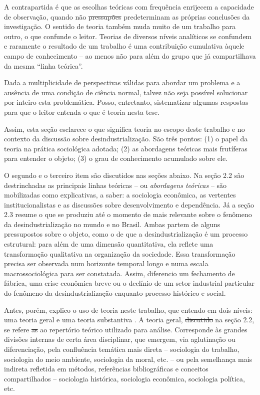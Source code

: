 A contrapartida é que as escolhas teóricas com frequência enrijecem a capacidade
de observação, quando não \sout{pressupões} predeterminam as próprias conclusões da investigação. O sentido de teoria também muda muito de um trabalho para outro, o que confunde o leitor.
Teorias de diversos níveis analíticos
se confundem e raramente o resultado de um trabalho é uma contribuição cumulativa
àquele campo de conhecimento -- ao menos não para além do grupo que já compartilhava da mesma ``linha teórica''.

Dada a multiplicidade de perspectivas válidas para abordar um problema
e a ausência de uma condição de ciência normal, talvez não seja possível solucionar
por inteiro esta problemática. Posso, entretanto, sistematizar algumas respostas para que o leitor entenda o que é teoria nesta tese.

Assim, esta seção esclarece o que significa teoria no escopo deste trabalho e no contexto da discussão sobre desindustrialização. São três pontos: (1) o papel da teoria na prática sociológica adotada; (2) as abordagens teóricas mais frutíferas para entender o objeto; (3) o grau de conhecimento acumulado sobre ele.

O segundo e o terceiro item são discutidos nas seções abaixo. Na seção 2.2 são
destrinchadas as principais linhas teóricas -- ou \emph{abordagens teóricas} --  são mobilizadas como explicativas, a saber:
a sociologia econômica, as vertentes institucionalistas e as discussões sobre desenvolvimento
e dependência. Já a seção 2.3 resume o que se produziu até o momento de mais relevante
sobre o fenômeno da desindustrialização no mundo e no Brasil. Ambas partem de alguns pressupostos sobre o objeto, como o de que a desindustrialização é um processo estrutural: para além de uma dimensão quantitativa, ela reflete uma transformação qualitativa na organização da sociedade. Essa transformação precisa ser observada num horizonte temporal longo e numa escala macrossociológica para ser constatada. Assim, diferencio um fechamento de fábrica, uma crise econômica breve ou o declínio de um setor industrial particular do fenômeno da desindustrialização enquanto processo histórico e social.

Antes, porém, explico o uso de teoria neste trabalho, que entendo em dois níveis: uma teoria geral e uma
teoria substantiva . A teoria geral, \sout{discutido} na seção 2.2, se refere \sout{as} ao repertório teórico utilizado para análise. Corresponde às grandes divisões internas de certa área disciplinar, que emergem, via
aglutinação ou diferenciação, pela confluência
temática mais direta -- sociologia do trabalho, sociologia do meio ambiente, sociologia da moral, etc. --
ou pela semelhança mais indireta refletida em métodos, referências bibliográficas e conceitos compartilhados -- sociologia histórica,
sociologia econômica, sociologia política, etc.

